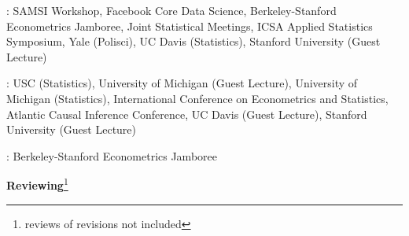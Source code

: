 \documentclass{article}
\begin{document}
\vspace{4mm}
: SAMSI Workshop, Facebook Core Data Science, Berkeley-Stanford Econometrics Jamboree, Joint Statistical Meetings, ICSA Applied Statistics Symposium, Yale (Polisci), UC Davis (Statistics), Stanford University (Guest Lecture)

\vspace{4mm}
: USC (Statistics), University of Michigan (Guest Lecture), University of Michigan (Statistics), International Conference on Econometrics and Statistics, Atlantic Causal Inference Conference, UC Davis (Guest Lecture), Stanford University (Guest Lecture)

\vspace{4mm}
: Berkeley-Stanford Econometrics Jamboree
 











\vspace{7mm}
\begin{large}
\noindent \textbf{Reviewing}\footnote{reviews of revisions not included}
\end{large}
\end{document}
